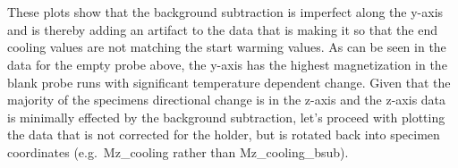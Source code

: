 \documentclass{article}
\begin{document}
    \begin{center}
    \end{center}
    { \hspace*{\fill} \\}
    
    \begin{center}
    \end{center}
    { \hspace*{\fill} \\}
    
    These plots show that the background subtraction is imperfect along the
y-axis and is thereby adding an artifact to the data that is making it
so that the end cooling values are not matching the start warming
values. As can be seen in the data for the empty probe above, the y-axis
has the highest magnetization in the blank probe runs with significant
temperature dependent change. Given that the majority of the specimens
directional change is in the z-axis and the z-axis data is minimally
effected by the background subtraction, let's proceed with plotting the
data that is not corrected for the holder, but is rotated back into
specimen coordinates (e.g.~Mz\_cooling rather than Mz\_cooling\_bsub).
\end{document}
